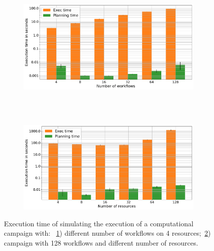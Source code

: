 \begin{figure}[ht!]
    \centering
    \begin{subfigure}[b]{0.75\textwidth}
        \includegraphics[width=.95\textwidth]{figures/manager/SimTimeWork.pdf}
        \caption{}
        \label{fig:SimTimeWork}
    \end{subfigure}\\
    ~ 
    \begin{subfigure}[b]{0.75\textwidth}
        \includegraphics[width=.95\textwidth]{figures/manager/SimTimeRes.pdf}
        \caption{}
        \label{fig:SimTimeRes}
    \end{subfigure}
    \caption{Execution time of simulating the execution of a computational campaign with: ~\ref{fig:SimTimeWork}) different number of workflows on 4 resources;~\ref{fig:SimTimeRes}) campaign with 128 workflows and different number of resources.}
    \label{fig:cm_char}
\end{figure}

